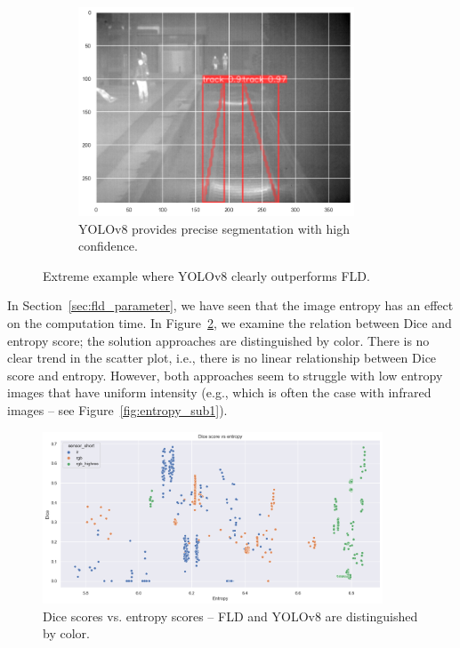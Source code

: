 \documentclass[Master,MDS,english]{BASE/twbook} %
\begin{document}
\begin{figure}
\begin{subfigure}[t]{.33\textwidth}
  \includegraphics[width=0.9\textwidth]{images/results/example_4_yolo}
  \caption{YOLOv8 provides precise segmentation with high confidence. }
\end{subfigure}
\caption{Extreme example where YOLOv8 clearly outperforms FLD.}
\label{fig:res_example4}
\end{figure}


In Section~\ref{sec:fld_parameter}, we have seen that the image entropy has an effect on the computation time. In Figure~\ref{fig:dice_vs_entropy}, we examine the relation between Dice and entropy score; the solution approaches are distinguished by color. There is no clear trend in the scatter plot, i.e., there is no linear relationship between Dice score and entropy. However,  both approaches seem to struggle with low entropy images that have uniform intensity  (e.g., which is often the case with infrared images -- see Figure~\ref{fig:entropy_sub1}).



\begin{figure}[h]
\centering
\includegraphics[width=0.9\textwidth]{images/results/dice_vs_entropy_nl}
\caption{Dice scores vs. entropy scores -- FLD and YOLOv8 are distinguished by color.  }
\label{fig:dice_vs_entropy}
\end{figure}
\end{document}
